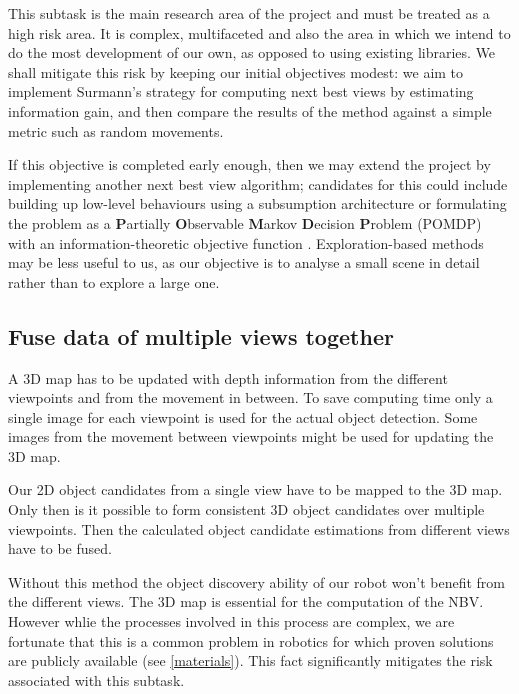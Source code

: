 \documentclass[a4paper,11pt,english]{article}
\begin{document}
This subtask is the main research area of the project and must be treated as a high risk area.
It is complex, multifaceted and also the area in which we intend to do the most development of our own, as opposed to using existing libraries.
We shall mitigate this risk by keeping our initial objectives modest: we aim to implement Surmann's strategy for computing next best views by estimating information gain, and then compare the results of the method against a simple metric such as random movements.

If this objective is completed early enough, then we may extend the project by implementing another next best view algorithm; candidates for this could include building up low-level behaviours using a subsumption architecture \cite{brooks1986robust} or formulating the problem as a \textbf{P}artially \textbf{O}bservable \textbf{M}arkov \textbf{D}ecision \textbf{P}roblem (POMDP) with an information-theoretic objective function \cite{lauri2015planning}.
Exploration-based methods may be less useful to us, as our objective is to analyse a small scene in detail rather than to explore a large one.

\subsection{Fuse data of multiple views together}\label{subtask-viewfusion}
A 3D map has to be updated with depth information from the different viewpoints and from the movement in between.
To save computing time only a single image for each viewpoint is used for the actual object detection.
Some images from the movement between viewpoints might be used for updating the 3D map.

Our 2D object candidates from a single view have to be mapped to the 3D map.
Only then is it possible to form consistent 3D object candidates over multiple viewpoints.
Then the calculated object candidate estimations from different views have to be fused.

Without this method the object discovery ability of our robot won't benefit from the different views.
The 3D map is essential for the computation of the NBV.
However whlie the processes involved in this process are complex, we are fortunate that this is a common problem in robotics for which proven solutions are publicly available (see \ref{materials}).
This fact significantly mitigates the risk associated with this subtask.
\end{document}
